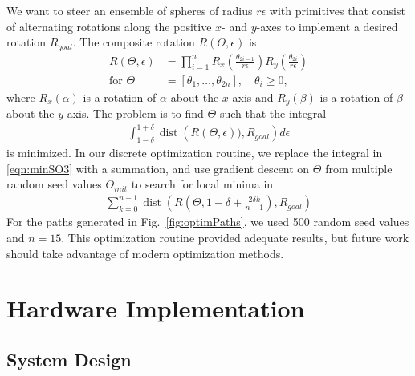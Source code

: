 \documentclass[letter paper, 10pt, conference]{ieeeconf}
\begin{document}
We want to steer an ensemble of spheres of radius $r\epsilon$ with primitives that consist of alternating rotations along the positive $x$- and $y$-axes to implement a desired rotation $R_{goal}$.  The composite rotation $R(\Theta,\epsilon)$ is 
\begin{align} \label{eqn:posRotations}
R(\Theta,\epsilon) &= \prod_{i = 1}^{n}{R_x\!\left(\frac{\theta_{2i-1}}{r \epsilon}\right) R_y\!\left(\frac{\theta_{2i}}{r \epsilon} \right)}\\
\text{for }\Theta &= \left[\theta_1,\ldots,\theta_{2n}\right], \quad \theta_i \ge 0, \nonumber
\end{align}
where $R_x(\alpha)$ is a rotation of $\alpha$ about the $x$-axis and $R_y(\beta)$ is a rotation of $\beta$ about the $y$-axis. 
The problem is to find $\Theta$ such that the integral
\begin{align}
\int_{1-\delta}^{1+\delta}\operatorname{dist}\left(R\left(\Theta,\epsilon\right)), R_{goal} \right) d\epsilon\label{eqn:minSO3}
\end{align}
is minimized.  In our discrete optimization routine, we replace the integral in \eqref{eqn:minSO3} with a summation,  and use gradient descent on $\Theta$ from multiple random seed values $\Theta_{init}$  to search for local minima in 
\begin{align}
\sum_{k = 0}^{n-1}\operatorname{dist}\!\left(R\left(\Theta,1-\delta +\frac{2\delta k}{ n-1}\right), R_{goal} \right) \label{eqn:minDiscreteSO3}
\end{align}
For the paths generated in Fig.~\ref{fig:optimPaths}, we used 500 random seed values and $n = 15$.  This optimization routine provided adequate results, but future work should take advantage of modern optimization methods.




 \section{Hardware Implementation}\label{sec:HardwareImplementation}
 \subsection{System Design}
   
\end{document}
